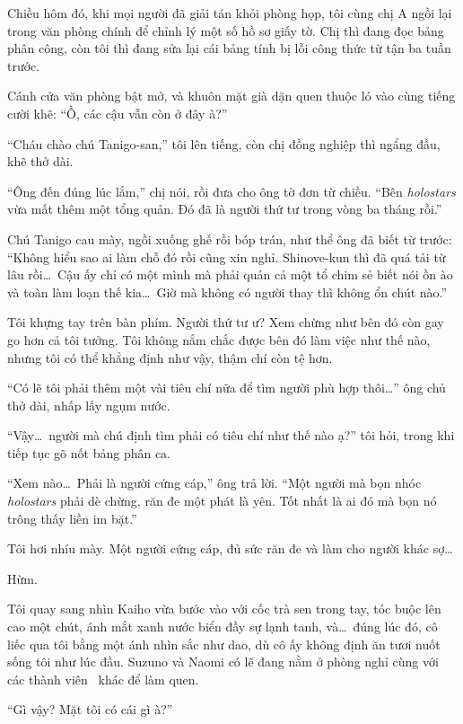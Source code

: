 \documentclass[../main.tex]{subfiles}
\begin{document}
\ct

Chiều hôm đó, khi mọi người đã giải tán khỏi phòng họp, tôi cùng chị A ngồi lại trong văn phòng chính để chỉnh lý một số hồ sơ giấy tờ. Chị thì đang đọc bảng phân công, còn tôi thì đang sửa lại cái bảng tính bị lỗi công thức từ tận ba tuần trước.

Cánh cửa văn phòng bật mở, và khuôn mặt già dặn quen thuộc ló vào cùng tiếng cười khẽ: ``Ồ, các cậu vẫn còn ở đây à?''

``Cháu chào chú Tanigo-san,'' tôi lên tiếng, còn chị đồng nghiệp thì ngẩng đầu, khẽ thở dài.

``Ông đến đúng lúc lắm,'' chị nói, rồi đưa cho ông tờ đơn từ chiều. ``Bên \textit{holostars} vừa mất thêm một tổng quản. Đó đã là người thứ tư trong vòng ba tháng rồi.''

Chú Tanigo cau mày, ngồi xuống ghế rồi bóp trán, như thể ông đã biết từ trước: ``Không hiểu sao ai làm chỗ đó rồi cũng xin nghỉ. Shinove-kun thì đã quá tải từ lâu rồi\dots\ Cậu ấy chỉ có một mình mà phải quản cả một tổ chim sẻ biết nói ồn ào và toàn làm loạn thế kia\dots\ Giờ mà không có người thay thì không ổn chút nào.''

Tôi khựng tay trên bàn phím. Người thứ tư ư? Xem chừng như bên đó còn gay go hơn cả tôi tưởng. Tôi không nắm chắc được bên đó làm việc như thế nào, nhưng tôi có thể khẳng định như vậy, thậm chí còn tệ hơn.

``Có lẽ tôi phải thêm một vài tiêu chí nữa để tìm người phù hợp thôi\dots'' ông chủ thở dài, nhấp lấy ngụm nước.

``Vậy\dots\ người mà chú định tìm phải có tiêu chí như thế nào ạ?'' tôi hỏi, trong khi tiếp tục gõ nốt bảng phân ca.

``Xem nào\dots\ Phải là người cứng cáp,'' ông trả lời. ``Một người mà bọn nhóc \textit{holostars} phải dè chừng, răn đe một phát là yên. Tốt nhất là ai đó mà bọn nó trông thấy liền im bặt.''

Tôi hơi nhíu mày. Một người cứng cáp, đủ sức răn đe và làm cho người khác sợ\dots

Hừm.

Tôi quay sang nhìn Kaiho vừa bước vào với cốc trà sen trong tay, tóc buộc lên cao một chút, ánh mắt xanh nước biển đầy sự lạnh tanh, và\dots\ đúng lúc đó, cô liếc qua tôi bằng một ánh nhìn sắc như dao, dù cô ấy không định ăn tươi nuốt sống tôi như lúc đầu. Suzuno và Naomi có lẽ đang nằm ở phòng nghỉ cùng với các thành viên \hll\ khác để làm quen.

``Gì vậy? Mặt tôi có cái gì à?''
\end{document}
